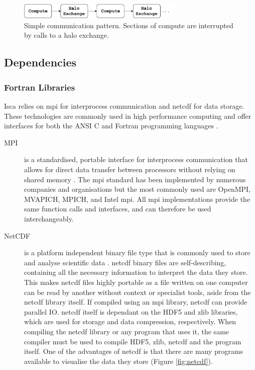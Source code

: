 \documentclass[a4paper,11pt]{report}
\begin{document}
\begin{figure}[htbp]
\begin{center}
\includegraphics[width=0.7\textwidth]{img/comm_pattern.pdf}
\caption[Simple halo exchange]{Simple communication pattern. Sections of compute are interrupted by calls to a halo exchange.}
\label{fig:halo-exchange}
\end{center}
\end{figure}


\subsection{Dependencies}
\label{sec:dependencies}
\subsubsection{Fortran Libraries}
Isca relies on \gls{mpi} for interprocess communication and \gls{netcdf} for data storage. These technologies are commonly used in high performance computing and offer interfaces for both the ANSI C and Fortran programming languages \cite{mpi2015standard, rew1990netcdf}.

\begin{description}
	\item[MPI] is a standardised, portable interface for interprocess communication that allows for direct data transfer between processors without relying on shared memory \cite{mpi2015standard}. The \gls{mpi} standard has been implemented by numerous companies and organisations but the most commonly used are OpenMPI, MVAPICH, MPICH, and Intel \gls{mpi}. All \gls{mpi} implementations provide the same function calls and interfaces, and can therefore be used interchangeably. 
	
	\item[NetCDF] is a platform independent binary file type that is commonly used to store and analyse scientific data \cite{rew1990netcdf}. \gls{netcdf} binary files are self-describing, containing all the necessary information to interpret the data they store. This makes \gls{netcdf} files highly portable as a file written on one computer can be read by another without context or specialist tools, aside from the \gls{netcdf} library itself. If compiled using an \gls{mpi} library, \gls{netcdf} can provide parallel IO. \gls{netcdf} itself is dependant on the HDF5 and zlib libraries, which are used for storage and data compression, respectively. When compiling the \gls{netcdf} library or any program that uses it, the same compiler must be used to compile HDF5, zlib, \gls{netcdf} and the program itself. One of the advantages of \gls{netcdf} is that there are many programs available to visualise the data they store (Figure \ref{fig:netcdf}). 
\end{description}
\end{document}
